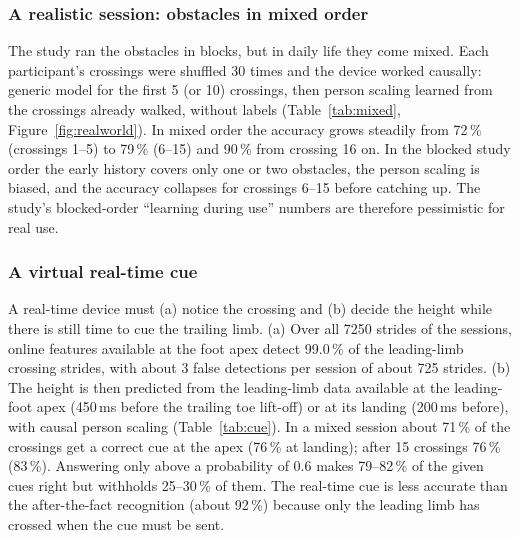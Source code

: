 \subsubsection{A realistic session: obstacles in mixed order}
\label{sec:res-realworld}

The study ran the obstacles in blocks, but in daily life they come mixed. Each participant's crossings were shuffled 30 times and
the device worked causally: generic model for the first 5 (or 10) crossings, then person scaling learned from the crossings
already walked, without labels (Table~\ref{tab:mixed}, Figure~\ref{fig:realworld}). In mixed order the accuracy grows steadily
from 72\,\% (crossings 1--5) to 79\,\% (6--15) and 90\,\% from crossing 16 on. In the blocked study order the early history
covers only one or two obstacles, the person scaling is biased, and the accuracy collapses for crossings 6--15 before catching up.
The study's blocked-order ``learning during use'' numbers are therefore pessimistic for real use.

\begin{table}[htbp]
\centering
\caption{Accuracy by crossing number in a session, mixed (mean of 30 random orders) vs the real blocked order; generic model until
the switch, then causal person scaling.}
\label{tab:mixed}

\end{table}

\subsubsection{A virtual real-time cue}
\label{sec:res-cue}

A real-time device must (a) notice the crossing and (b) decide the height while there is still time to cue the trailing limb.
(a) Over all 7250 strides of the sessions, online features available at the foot apex detect 99.0\,\% of the leading-limb
crossing strides, with about 3 false detections per session of about 725 strides. (b) The height is then predicted from the
leading-limb data available at the leading-foot apex (450\,ms before the trailing toe lift-off) or at its landing (200\,ms
before), with causal person scaling (Table~\ref{tab:cue}). In a mixed session about 71\,\% of the crossings get a correct cue at
the apex (76\,\% at landing); after 15 crossings 76\,\% (83\,\%). Answering only above a probability of 0.6 makes 79--82\,\% of
the given cues right but withholds 25--30\,\% of them. The real-time cue is less accurate than the after-the-fact recognition
(about 92\,\%) because only the leading limb has crossed when the cue must be sent.


